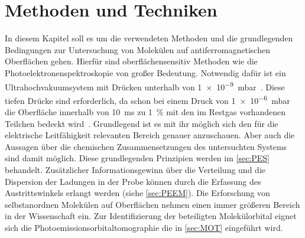 \chapter{Methoden und Techniken} \label{cha:Methoden}
    In diesem Kapitel soll es um die verwendeten Methoden und die grundlegenden Bedingungen zur Untersuchung von Molekülen auf antiferromagnetischen Oberflächen gehen.
    Hierfür sind oberflächensensitiv Methoden wie die Photoelektronenspektroskopie von großer Bedeutung.
    Notwendig dafür ist ein Ultrahochvakuumsystem mit Drücken unterhalb von \SI{1e-9}{\milli\bar}~\cite{Henzler}.
    Diese tiefen Drücke sind erforderlich, da schon bei einem Druck von \SI{1e-6}{\milli\bar} die Oberfläche innerhalb von \SI{10}{\milli\second} zu \SI{1}{\percent} mit den im Restgas vorhandenen Teilchen bedeckt wird~\cite{Henzler}.
    Grundlegend ist es mit ihr möglich sich den für die elektrische Leitfähigkeit relevanten Bereich genauer anzuschauen. 
    Aber auch die Aussagen über die chemischen Zusammensetzungen des untersuchten Systems sind damit möglich.
    Diese grundlegenden Prinzipien werden im \autoref{sec:PES} behandelt.
    Zusätzlicher Informationsgewinn über die Verteilung und die Dispersion der Ladungen in der Probe können durch die Erfassung des Austrittswinkels erlangt werden (siehe \autoref{sec:PEEM}).
    Die Erforschung von selbstanordnen Molekülen auf Oberflächen nehmen einen immer größeren Bereich in der Wissenschaft ein. 
    Zur Identifizierung der beteiligten Molekülorbital eignet sich die Photoemissionsorbitaltomographie die in \autoref{sec:MOT} eingeführt wird.

